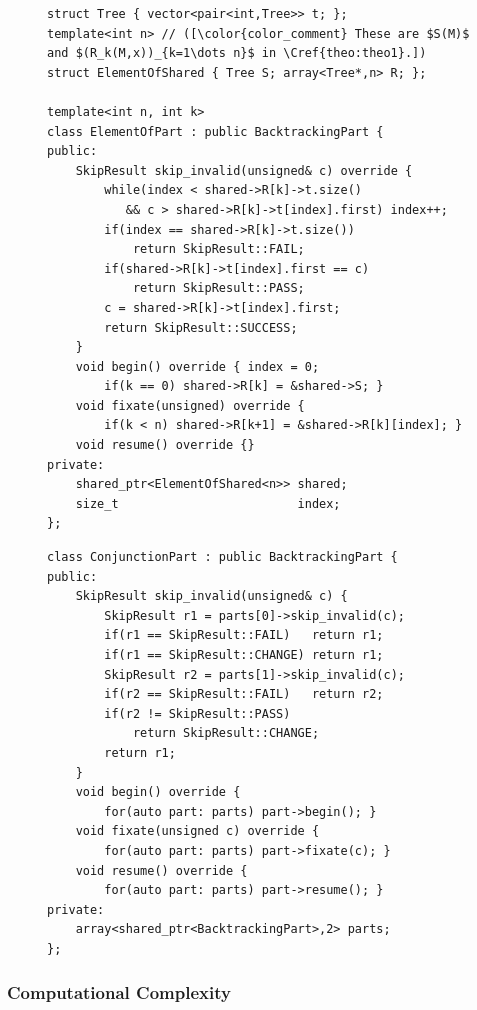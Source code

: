\begin{figure}[p]
\begin{lstlisting}[language=MyCpp]
struct Tree { vector<pair<int,Tree>> t; };
template<int n> // ([\color{color_comment} These are $S(M)$ and $(R_k(M,x))_{k=1\dots n}$ in \Cref{theo:theo1}.])
struct ElementOfShared { Tree S; array<Tree*,n> R; };

template<int n, int k>
class ElementOfPart : public BacktrackingPart {
public:
    SkipResult skip_invalid(unsigned& c) override {
        while(index < shared->R[k]->t.size()
           && c > shared->R[k]->t[index].first) index++;
        if(index == shared->R[k]->t.size())
            return SkipResult::FAIL;
        if(shared->R[k]->t[index].first == c)
            return SkipResult::PASS;
        c = shared->R[k]->t[index].first;
        return SkipResult::SUCCESS;
    }
    void begin() override { index = 0;
        if(k == 0) shared->R[k] = &shared->S; }
    void fixate(unsigned) override {
        if(k < n) shared->R[k+1] = &shared->R[k][index]; }
    void resume() override {}
private:
    shared_ptr<ElementOfShared<n>> shared;
    size_t                         index;
};
\end{lstlisting}
\begin{lstlisting}[language=MyCpp, label={partimplementations}, caption=
   {``{\tt BacktrackingPart}'' is implemented for element-of constraints and
    conjunction constraints.
    The array ``{\tt R}'' in ``{\tt ElementOfShared}'' matches
    $\protect{(R_k(M,x))_{k=1\dots n}}$ from \Cref{theo:theo1}.}]
class ConjunctionPart : public BacktrackingPart {
public:
    SkipResult skip_invalid(unsigned& c) {
        SkipResult r1 = parts[0]->skip_invalid(c);
        if(r1 == SkipResult::FAIL)   return r1;
        if(r1 == SkipResult::CHANGE) return r1;
        SkipResult r2 = parts[1]->skip_invalid(c);
        if(r2 == SkipResult::FAIL)   return r2;
        if(r2 != SkipResult::PASS)
            return SkipResult::CHANGE;
        return r1;
    }
    void begin() override {
        for(auto part: parts) part->begin(); }
    void fixate(unsigned c) override {
        for(auto part: parts) part->fixate(c); }
    void resume() override {
        for(auto part: parts) part->resume(); }
private:
    array<shared_ptr<BacktrackingPart>,2> parts;
};
\end{lstlisting}
\end{figure}

\subsubsection{Computational Complexity}


